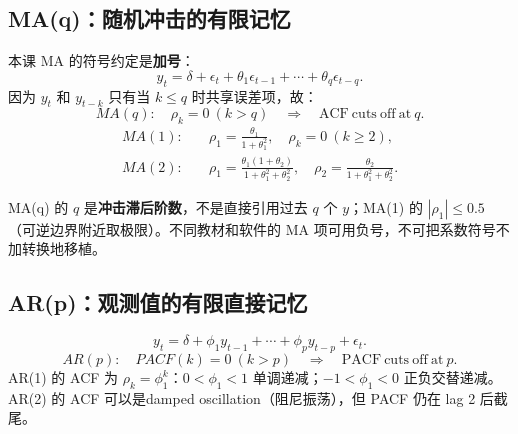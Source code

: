 \documentclass[UTF8,fontset=fandol,10.5pt,a4paper]{ctexart}
\newcommand{\eng}[1]{{\sffamily\color{navy}#1}}
\newcommand{\formula}[1]{\[\boxed{#1}\]}
\begin{document}
\subsection{MA(q)：随机冲击的有限记忆}
本课 MA 的符号约定是\textbf{加号}：
\[y_t=\delta+\epsilon_t+\theta_1\epsilon_{t-1}+\cdots+\theta_q\epsilon_{t-q}.\]
因为 $y_t$ 和 $y_{t-k}$ 只有当 $k\le q$ 时共享误差项，故：
\formula{MA(q):\quad \rho_k=0\ (k>q)\quad\Longrightarrow\quad \mathrm{ACF\ cuts\ off\ at}\ q.}
\begin{align*}
MA(1):\quad &\rho_1=\frac{\theta_1}{1+\theta_1^2},\quad\rho_k=0\ (k\ge2),\\
MA(2):\quad &\rho_1=\frac{\theta_1(1+\theta_2)}{1+\theta_1^2+\theta_2^2},\quad \rho_2=\frac{\theta_2}{1+\theta_1^2+\theta_2^2}.
\end{align*}
\par\smallskip{}\par\smallskip
\par\smallskip{}\par\smallskip
\begin{pitbox}
MA(q) 的 $q$ 是\textbf{冲击滞后阶数}，不是直接引用过去 $q$ 个 $y$；MA(1) 的 $|\rho_1|\le 0.5$（可逆边界附近取极限）。不同教材和软件的 MA 项可用负号，不可把系数符号不加转换地移植。
\end{pitbox}
\subsection{AR(p)：观测值的有限直接记忆}
\[y_t=\delta+\phi_1y_{t-1}+\cdots+\phi_py_{t-p}+\epsilon_t.\]
\formula{AR(p):\quad PACF(k)=0\ (k>p)\quad\Longrightarrow\quad\mathrm{PACF\ cuts\ off\ at}\ p.}
AR(1) 的 ACF 为 $\rho_k=\phi_1^k$：$0<\phi_1<1$ 单调递减；$-1<\phi_1<0$ 正负交替递减。AR(2) 的 ACF 可以是\eng{damped oscillation}（阻尼振荡），但 PACF 仍在 lag 2 后截尾。
\par\smallskip{}\par\smallskip
\par\smallskip{}\par\smallskip
\end{document}
